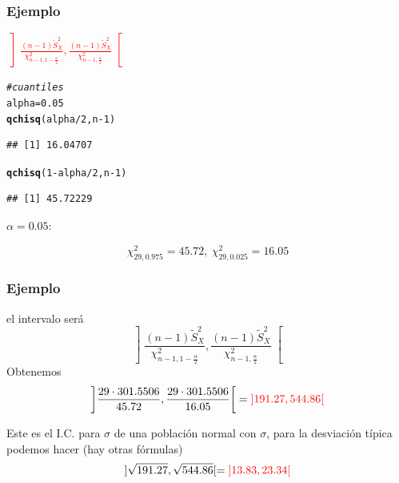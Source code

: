 \documentclass[12pt,t]{beamer}\usepackage[]{graphicx}\usepackage[]{color}
\makeatletter
\newcommand{\hlnum}[1]{\textcolor[rgb]{0.686,0.059,0.569}{#1}}%
\newcommand{\hlcom}[1]{\textcolor[rgb]{0.678,0.584,0.686}{\textit{#1}}}%
\newcommand{\hlopt}[1]{\textcolor[rgb]{0,0,0}{#1}}%
\newcommand{\hlstd}[1]{\textcolor[rgb]{0.345,0.345,0.345}{#1}}%
\newcommand{\hlkwb}[1]{\textcolor[rgb]{0.69,0.353,0.396}{#1}}%
\newcommand{\hlkwd}[1]{\textcolor[rgb]{0.737,0.353,0.396}{\textbf{#1}}}%
\newenvironment{kframe}{%
 \def\at@end@of@kframe{}%
 \ifinner\ifhmode%
  \def\at@end@of@kframe{\end{minipage}}%
  \begin{minipage}{\columnwidth}%
 \fi\fi%
 \def\FrameCommand##1{\hskip\@totalleftmargin \hskip-\fboxsep
 \colorbox{shadecolor}{##1}\hskip-\fboxsep
     \hskip-\linewidth \hskip-\@totalleftmargin \hskip\columnwidth}%
 \MakeFramed {\advance\hsize-\width
   \@totalleftmargin\z@ \linewidth\hsize
   \@setminipage}}%
 {\par\unskip\endMakeFramed%
 \at@end@of@kframe}
\newenvironment{knitrout}{}{} %
\newcommand{\red}[1]{\textcolor{red}{#1}}
\theoremstyle{plain}
\theoremstyle{definition}
\makeatother
\begin{document}
\begin{frame}[fragile]
\frametitle{Ejemplo}
\red{$\displaystyle \left] \frac{(n-1)\widetilde{S}_{X}^2}{\chi_{n-1,1-\frac{\alpha}{2}}^2},
\frac{(n-1)\widetilde{S}_{X}^2}{\chi_{n-1,\frac{\alpha}{2}}^2}
\right[$}

\begin{knitrout}
\color{fgcolor}\begin{kframe}
\begin{alltt}
\hlcom{#cuantiles}
\hlstd{alpha}\hlkwb{=}\hlnum{0.05}
\hlkwd{qchisq}\hlstd{(alpha}\hlopt{/}\hlnum{2}\hlstd{,n}\hlopt{-}\hlnum{1}\hlstd{)}
\end{alltt}
\begin{verbatim}
## [1] 16.04707
\end{verbatim}
\begin{alltt}
\hlkwd{qchisq}\hlstd{(}\hlnum{1}\hlopt{-}\hlstd{alpha}\hlopt{/}\hlnum{2}\hlstd{,n}\hlopt{-}\hlnum{1}\hlstd{)}
\end{alltt}
\begin{verbatim}
## [1] 45.72229
\end{verbatim}
\end{kframe}
\end{knitrout}
\medskip


$\alpha=0.05$:

$$
\chi_{29,0.975}^2=45.72,\
\chi_{29,0.025}^2=16.05
$$
\end{frame}

\begin{frame} 
\frametitle{Ejemplo}

el intervalo será
$$
\left] \frac{(n-1)\widetilde{S}_{X}^2}{\chi_{n-1,1-\frac{\alpha}{2}}^2},
\frac{(n-1)\widetilde{S}_{X}^2}{\chi_{n-1,\frac{\alpha}{2}}^2}
\right[
$$
Obtenemos
$$
\left] \frac{29\cdot 301.5506}{45.72},
\frac{29\cdot 301.5506}{16.05}
\right[=
\red{]191.27, 544.86[}
$$

Este  es el I.C. para $\sigma$ de una población normal con $\sigma$, para la desviación típica podemos hacer (hay otras fórmulas) 
$$
]\sqrt{191.27}, \sqrt{544.86}[=\red{]13.83,23.34[}
$$

\end{frame}
\end{document}
